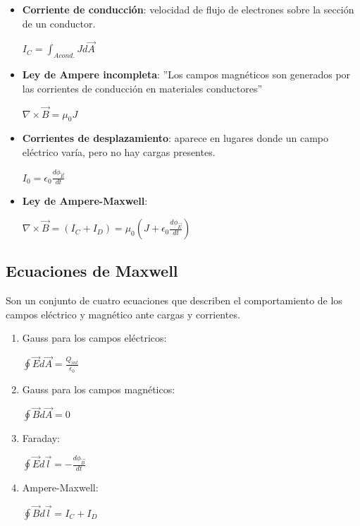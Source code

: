 \documentclass[a4paper]{article}
\begin{document}
\begin{multicols}{2}
\begin{itemize}
                        \item \textbf{Corriente de conducción}: velocidad de flujo de electrones sobre la sección de un conductor.
                            \begin{center} $I_C = \int_{A cond.} Jd\vec{A}$ \end{center}
                        \item \textbf{Ley de Ampere incompleta}: ''Los campos magnéticos son generados por las corrientes de conducción en materiales conductores''
                            \begin{center} $\nabla \times \vec{B} = \mu_0 J$ \end{center}
                        \item \textbf{Corrientes de desplazamiento}: aparece en lugares donde un campo eléctrico varía, pero no hay cargas presentes.
                            \begin{center} $I_0 = \epsilon_0 \frac {d\phi_{\vec{E}}}{dt}$ \end{center}
                        \item \textbf{Ley de Ampere-Maxwell}: 
                            \begin{center} $\nabla \times \vec{B} = (I_C + I_D) = \mu_0 (J + \epsilon_0 \frac{d\phi_{\vec{E}}}{dt})$ \end{center}
                    \end{itemize}
        \subsection{Ecuaciones de Maxwell}
            \indent Son un conjunto de cuatro ecuaciones que describen el comportamiento de los campos eléctrico y magnético ante cargas y corrientes. 
            \begin{enumerate}
                \item Gauss para los campos eléctricos:
                    \begin{center} $\oint \vec{E} d\vec{A} = \frac{Q_{int}}{\epsilon_0}$ \end{center}
                \item Gauss para los campos magnéticos:
                    \begin{center} $\oint \vec{B} d\vec{A} = 0 $ \end{center}
                \item Faraday:
                    \begin{center} $\oint \vec{E} d\vec{l} = - \frac{d\phi_{\vec{B}}}{dt}$ \end{center}
                \item Ampere-Maxwell:
                    \begin{center} $\oint \vec{B} d\vec{l} = I_C + I_D$ \end{center}
            \end{enumerate}

\end{multicols}
\end{document}
